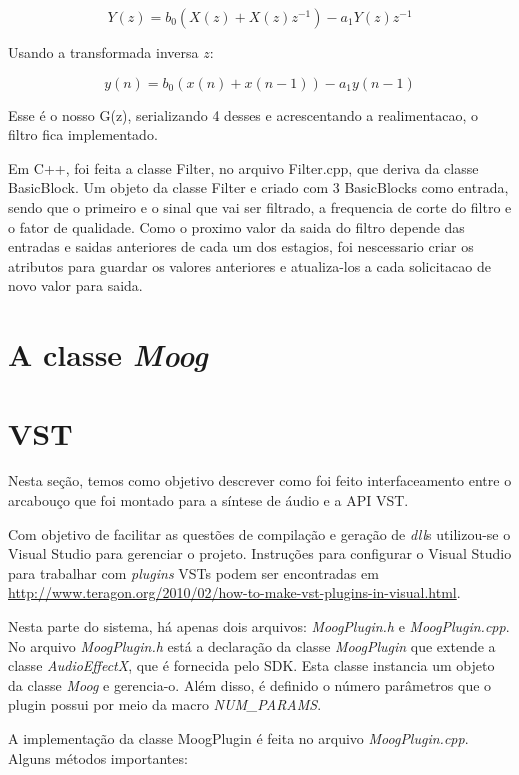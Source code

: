 \documentclass{article}
\begin{document}
\begin{equation}\label{eq:(5)}
Y(z) = b_0(X(z)+X(z)z^{-1})-a_1Y(z)z^{-1}
\end{equation}

Usando a transformada inversa $z$:

\begin{equation}\label{eq:(6)}
y(n)=b_0(x(n)+x(n-1))-a_1 y(n-1)  
\end{equation}


Esse é o nosso G(z), serializando 4 desses e acrescentando a realimentacao, o filtro fica implementado.

Em C++, foi feita a classe Filter, no arquivo Filter.cpp, que deriva da classe BasicBlock. Um objeto da classe Filter e criado com 3 BasicBlocks como entrada, sendo que o primeiro e o sinal que vai ser filtrado, a frequencia de corte do filtro e o fator de qualidade. Como o proximo valor da saida do filtro depende das entradas e saidas anteriores de cada um dos estagios, foi nescessario criar os atributos para guardar os valores anteriores e atualiza-los a cada solicitacao de novo valor para saida.

\section{A classe \emph{Moog}}

\section{VST}
Nesta seção, temos como objetivo 
descrever como foi feito interfaceamento entre o arcabouço que foi montado 
para a síntese de áudio e a API VST.

Com objetivo de facilitar as questões de compilação e geração de \emph{dll}s 
utilizou-se o Visual Studio para gerenciar o projeto. Instruções para configurar 
o Visual Studio para trabalhar com \emph{plugins} VSTs podem ser encontradas em 
\url{http://www.teragon.org/2010/02/how-to-make-vst-plugins-in-visual.html}.

Nesta parte do sistema, há apenas dois arquivos: \emph{MoogPlugin.h} e \emph{MoogPlugin.cpp}.
No arquivo \emph{MoogPlugin.h} está a declaração da classe \emph{MoogPlugin} que 
extende a classe \emph{AudioEffectX}, que é fornecida pelo SDK. Esta classe instancia 
um objeto da classe \emph{Moog} e gerencia-o. Além disso, é 
definido o número parâmetros que o plugin possui por meio da macro \emph{NUM\_PARAMS}.

A implementação da classe MoogPlugin é feita no arquivo \emph{MoogPlugin.cpp}. Alguns 
métodos importantes:
\end{document}
